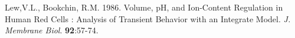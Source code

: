 \documentclass[a4paper,fleqn]{article}
\begin{document}
Lew,V.L., Bookchin, R.M. 1986. Volume, pH, and Ion-Content Regulation in Human Red Cells : Analysis of Transient Behavior with  an Integrate Model. \textit{J. Membrane Biol}. \textbf{92}:57-74.\\
 







\end{document}
